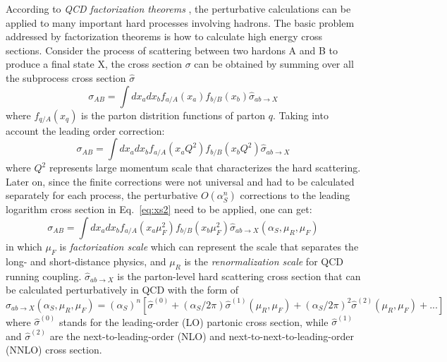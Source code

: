 According to \textit{QCD factorization theorems} \cite{Collins:1989gx}, the perturbative calculations can be applied to many important
hard processes involving hadrons. The basic problem addressed by factorization theorems is how to calculate high energy cross sections.
Consider the process of scattering between two hardons A and B to produce a final state X, the cross section $\sigma$ can be obtained 
by summing over all the subprocess cross section $\hat{\sigma}$ \cite{Stirling:1194745}
\begin{equation}
	\sigma_{AB} = \int dx_{a} dx_{b} f_{a/A}\left(x_{a}\right) f_{b/B}\left(x_{b}\right) \hat{\sigma}_{ab\rightarrow X}
\end{equation}
where $f_{q/A}\left(x_{q}\right)$ is the parton distrition functions of parton $q$.
Taking into account the leading order correction:
\begin{equation} \label{eq:xs2}
	\sigma_{AB} = \int dx_{a} dx_{b} f_{a/A}\left(x_{a}Q^{2}\right) f_{b/B}\left(x_{b}Q^{2}\right) \hat{\sigma}_{ab\rightarrow X}
\end{equation}
where $Q^{2}$ represents large momentum scale that characterizes the hard scattering.
Later on, since the finite corrections were not universal and had to be calculated separately for each process,
the perturbative $O\left(\alpha_{S}^{n}\right)$ corrections to the leading logarithm cross section in Eq.~\ref{eq:xs2}
need to be applied, one can get:
\begin{equation}
	\sigma_{AB} = \int dx_{a} dx_{b} f_{a/A}\left(x_{a}\mu_{F}^{2}\right) f_{b/B}\left(x_{b}\mu_{F}^{2}\right) \hat{\sigma}_{ab\rightarrow X}\left(\alpha_{S},\mu_{R},\mu_{F}\right)
\end{equation}
in which $\mu_{F}$ is \textit{factorization scale} which can represent the scale that separates the long- and short-distance physics,
and $\mu_{R}$ is the \textit{renormalization scale} for QCD running coupling.
$\hat{\sigma}_{ab\rightarrow X}$ is the parton-level hard scattering cross section that can be calculated perturbatively in QCD with the form of
\begin{equation} \label{eq:xs3}
	\hat{\sigma}_{ab\rightarrow X}\left(\alpha_{S},\mu_{R},\mu_{F}\right) 
		= \left(\alpha_{S}\right)^{n} \left[ \hat{\sigma}^{(0)}
		+ \left(\alpha_{S}/2\pi\right) \hat{\sigma}^{(1)}\left(\mu_{R},\mu_{F}\right)
		+ \left(\alpha_{S}/2\pi\right)^{2} \hat{\sigma}^{(2)}\left(\mu_{R},\mu_{F}\right)
		+ ... \right]
\end{equation}
where $\hat{\sigma}^{(0)}$ stands for the leading-order (LO) partonic cross section,
while $\hat{\sigma}^{(1)}$ and $\hat{\sigma}^{(2)}$ are the next-to-leading-order (NLO) and
next-to-next-to-leading-order (NNLO) cross section.

